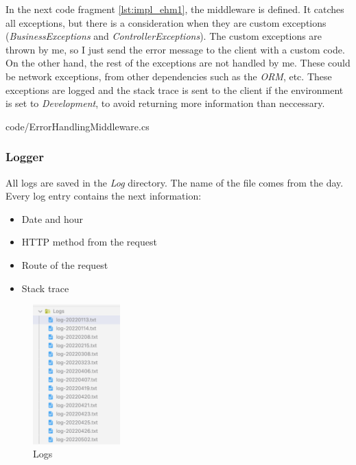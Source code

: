         In the next code fragment \ref{lst:impl_ehm1}, the middleware is defined. It catches all exceptions, but there is a consideration when 
        they are custom exceptions (\textit{BusinessExceptions} and \textit{ControllerExceptions}).
        The custom exceptions are thrown by me, so I just send the error message to the client with a custom code.
        On the other hand, the rest of the exceptions are not handled by me. 
        These could be network exceptions, from other dependencies such as the \textit{ORM}, etc. These exceptions are logged and
        the stack trace is sent to the client if the environment is set to \textit{Development}, to avoid returning more information than neccessary.
        
        {code/ErrorHandlingMiddleware.cs}

        \subsubsection{Logger}
            All logs are saved in the \textit{Log} directory. The name of the file comes from the day. Every log entry contains the next information:
            \begin{itemize}[noitemsep]
                \item Date and hour
                \item HTTP method from the request
                \item Route of the request
                \item Stack trace
            \end{itemize}
            \begin{figure}[H]
                \centering
                    \includegraphics[width=0.3\textwidth]{assets/logs.png}
                \caption{Logs}
                \label{fig:implementation_logs}
            \end{figure}
        
